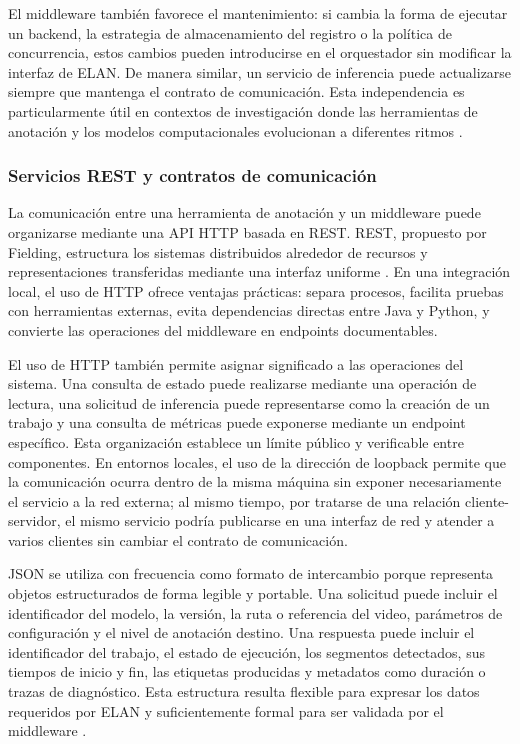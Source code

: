 \documentclass[11pt,a4paper]{article}
\begin{document}
El middleware también favorece el mantenimiento: si cambia la forma de ejecutar un backend, la estrategia de almacenamiento del registro o la política de concurrencia, estos cambios pueden introducirse en el orquestador sin modificar la interfaz de ELAN. De manera similar, un servicio de inferencia puede actualizarse siempre que mantenga el contrato de comunicación. Esta independencia es particularmente útil en contextos de investigación donde las herramientas de anotación y los modelos computacionales evolucionan a diferentes ritmos \cite{iso25010}.

\subsubsection{Servicios REST y contratos de comunicación}

La comunicación entre una herramienta de anotación y un middleware puede organizarse mediante una API HTTP basada en REST. REST, propuesto por Fielding, estructura los sistemas distribuidos alrededor de recursos y representaciones transferidas mediante una interfaz uniforme \cite{fielding2000rest}. En una integración local, el uso de HTTP ofrece ventajas prácticas: separa procesos, facilita pruebas con herramientas externas, evita dependencias directas entre Java y Python, y convierte las operaciones del middleware en endpoints documentables.

El uso de HTTP también permite asignar significado a las operaciones del sistema. Una consulta de estado puede realizarse mediante una operación de lectura, una solicitud de inferencia puede representarse como la creación de un trabajo y una consulta de métricas puede exponerse mediante un endpoint específico. Esta organización establece un límite público y verificable entre componentes. En entornos locales, el uso de la dirección de loopback permite que la comunicación ocurra dentro de la misma máquina sin exponer necesariamente el servicio a la red externa; al mismo tiempo, por tratarse de una relación cliente-servidor, el mismo servicio podría publicarse en una interfaz de red y atender a varios clientes sin cambiar el contrato de comunicación.

JSON se utiliza con frecuencia como formato de intercambio porque representa objetos estructurados de forma legible y portable. Una solicitud puede incluir el identificador del modelo, la versión, la ruta o referencia del video, parámetros de configuración y el nivel de anotación destino. Una respuesta puede incluir el identificador del trabajo, el estado de ejecución, los segmentos detectados, sus tiempos de inicio y fin, las etiquetas producidas y metadatos como duración o trazas de diagnóstico. Esta estructura resulta flexible para expresar los datos requeridos por ELAN y suficientemente formal para ser validada por el middleware \cite{pydantic2026models}.
\end{document}
